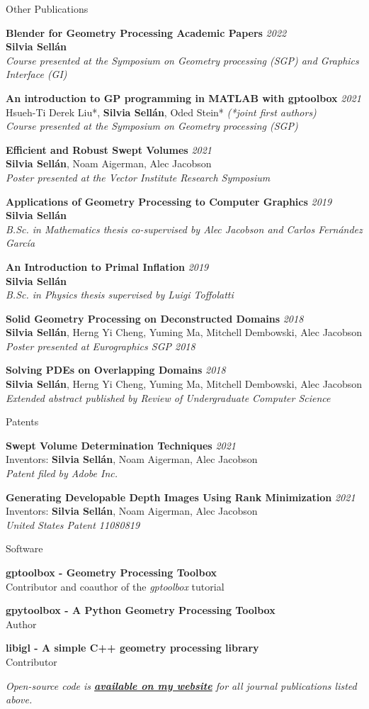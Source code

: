 \documentclass{resume}
\newcommand{\software}[2]{
    {\bf #1}\\ 
    {\small#2 }}
\newcommand{\publication}[5]{
    {\bf #1} \hfill {\em \small #2} \\ %
    {\small#3}{\small \bf Silvia Sell\'{a}n}{\small #4} \\ %
    {\small \it #5} %
}
\newcommand{\patent}[5]{
    {\bf #1} \hfill {\em \small #2} \\ %
    {\small Inventors: #3}{\small \bf Silvia Sell\'{a}n}{\small #4} \\ %
    {\small \it #5} %
}
\begin{document}
\begin{rSection}{Other Publications}

\publication{Blender for Geometry Processing Academic Papers}{2022}{}{}{Course presented at the Symposium on Geometry processing (SGP) and Graphics Interface  (GI)}

\publication{An introduction to GP programming in MATLAB with gptoolbox}{2021}{ 
Hsueh-Ti Derek Liu*, }{*, Oded Stein* \textit{(*joint first authors)}}{Course presented at the Symposium on Geometry processing (SGP)}

\publication{Efficient and Robust Swept Volumes}{2021}{}{, Noam Aigerman, Alec Jacobson}{Poster presented at the Vector Institute Research Symposium}

\publication{Applications of Geometry Processing to Computer Graphics}{2019}{}{}{B.Sc. in Mathematics thesis co-supervised by Alec Jacobson and Carlos Fernández García}

\publication{An Introduction to Primal Inflation}{2019}{}{}{B.Sc. in Physics thesis supervised by Luigi Toffolatti}

\publication{Solid Geometry Processing on Deconstructed Domains}{2018}{}{, Herng Yi Cheng, Yuming Ma, Mitchell Dembowski, Alec Jacobson}
{Poster presented at Eurographics SGP 2018}

\publication{Solving PDEs on Overlapping Domains}{2018}{}{, Herng Yi Cheng, Yuming Ma, Mitchell Dembowski, Alec Jacobson}{Extended abstract published by Review of Undergraduate Computer Science}

\end{rSection}

\begin{rSection}{Patents}

\patent{Swept Volume Determination Techniques}{2021}{}{, Noam Aigerman, Alec Jacobson}{Patent filed by Adobe Inc.}

\patent{Generating Developable Depth Images Using Rank Minimization}{2021}{}{, Noam Aigerman, Alec Jacobson}{United States Patent 11080819}

\end{rSection}

\begin{rSection}{Software}

\software{gptoolbox - Geometry Processing Toolbox}{Contributor and coauthor of the \textit{gptoolbox} tutorial}

\software{gpytoolbox - A Python Geometry Processing Toolbox}{Author}

\software{libigl - A simple C++ geometry processing library}{Contributor}


\textit{Open-source code is \href{http://dgp.toronto.edu/~sgsellan/}{\textbf{available on my website}} for all journal publications listed above.}

\end{rSection}
\end{document}
